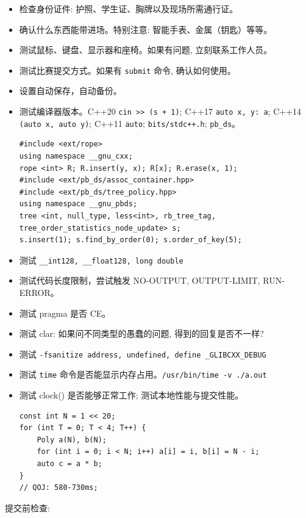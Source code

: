 \begin{small}
\begin{itemize}[leftmargin=1mm]
    \setlength{\itemsep}{0pt}
    \setlength{\parskip}{0.5pt}
    \item 检查身份证件: 护照、学生证、胸牌以及现场所需通行证。
    \item 确认什么东西能带进场。特别注意: 智能手表、金属（钥匙）等等。
    \item 测试鼠标、键盘、显示器和座椅。如果有问题, 立刻联系工作人员。
    \item 测试比赛提交方式。如果有 \texttt{submit} 命令, 确认如何使用。
    \item 设置自动保存，自动备份。
    \item 测试编译器版本。C++20 \texttt{cin >> (s + 1)}; C++17 \texttt{auto \lbrack x, y\rbrack : a}; C++14 \texttt{\lbrack \rbrack (auto x, auto y)}; C++11 \texttt{auto}; \texttt{bits/stdc++.h}; \texttt{pb\_ds}。
\begin{verbatim}
#include <ext/rope>
using namespace __gnu_cxx;
rope <int> R; R.insert(y, x); R[x]; R.erase(x, 1);
#include <ext/pb_ds/assoc_container.hpp> 
#include <ext/pb_ds/tree_policy.hpp> 
using namespace __gnu_pbds;
tree <int, null_type, less<int>, rb_tree_tag,
tree_order_statistics_node_update> s;
s.insert(1); s.find_by_order(0); s.order_of_key(5);
\end{verbatim}
    \item 测试 \texttt{\_\_int128, \_\_float128, long double}
    \item 测试代码长度限制，尝试触发 NO-OUTPUT, OUTPUT-LIMIT, RUN-ERROR。
    \item 测试 pragma 是否 CE。
    \item 测试 clar: 如果问不同类型的愚蠢的问题, 得到的回复是否不一样? 
    \item 测试 \texttt{-fsanitize address, undefined, define \_GLIBCXX\_DEBUG}
    \item 测试 \texttt{time} 命令是否能显示内存占用。\texttt{/usr/bin/time -v ./a.out}
    \item 测试 clock() 是否能够正常工作; 测试本地性能与提交性能。
\begin{verbatim}
const int N = 1 << 20;
for (int T = 0; T < 4; T++) {
    Poly a(N), b(N);
    for (int i = 0; i < N; i++) a[i] = i, b[i] = N - i;
    auto c = a * b;
}
// QOJ: 580-730ms;
\end{verbatim}
\end{itemize}
提交前检查: 
\begin{itemize}[leftmargin=1mm]

\end{itemize}
\end{small}
